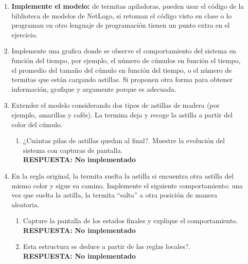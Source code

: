 \documentclass[12pt]{article}
\begin{document}
\begin{enumerate}
    \item \textbf{Implemente el modelo:} de termitas apiladoras, pueden usar el código de la biblioteca de modelos de NetLogo, si retoman el código visto en clase o lo programan en otro lenguaje de
    programación tienen un punto extra en el ejercicio.\\
    \item Implemente una grafica donde se observe el comportamiento del sistema en función del tiempo, por ejemplo, el número de cúmulos en función el tiempo, el promedio del tamaño del
    cúmulo en función del tiempo, o el número de termitas que están cargando astillas. Si proponen otra forma para obtener información, grafique y argumente porque es adecuada.\\
    \item Extender el modelo considerando dos tipos de astillas de madera (por ejemplo, amarillas y cafés). La termina deja y recoge la astilla a partir del color del cúmulo.\\
    \begin{enumerate}
        \item ¿Cuántas pilas de astillas quedan al final?. Muestre la evolución del sistema con capturas de pantalla.\\
        \textbf{\color{red} RESPUESTA: No implementado}\\
    \end{enumerate}
    \item En la regla original, la termita suelta la astilla si encuentra otra astilla del mismo color y sigue su camino. Implemente el siguiente comportamiento: una vez que suelta la astilla, la
    termita “salta” a otra posición de manera aleatoria.\\
    \begin{enumerate}
        \item Capture la pantalla de los estados finales y explique el comportamiento.\\
        \textbf{\color{red} RESPUESTA: No implementado}\\
        \item Esta estructura se deduce a partir de las reglas locales?.\\
        \textbf{\color{red} RESPUESTA: No implementado}\\
    \end{enumerate}
    
\end{enumerate}
\end{document}
